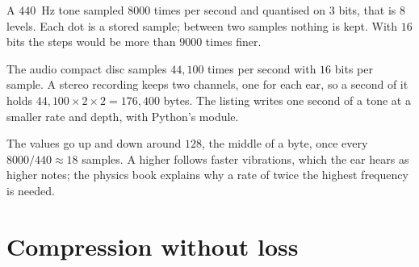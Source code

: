 \begin{omfigure}

{\small A $440$~Hz tone sampled $8000$ times per second and quantised on $3$ bits, that is $8$ levels. Each dot is a
stored sample; between two samples nothing is kept. With $16$ bits the steps would be more than $9000$ times finer.}
\end{omfigure}

The audio compact disc samples $44{,}100$ times per second with $16$ bits per sample. A stereo recording keeps two
channels, one for each ear, so a second of it holds $44{,}100 \times 2 \times 2 = 176{,}400$ bytes. The listing
writes one second of a tone at a smaller rate and depth, with Python's  module.

\label{lst:g10:images-sound-compression:make-wav}

\label{out:g10:images-sound-compression:make-wav}

The values go up and down around $128$, the middle of a byte, once every $8000 / 440 \approx 18$ samples. A higher
 follows faster vibrations, which the ear hears as higher notes; the physics book explains why a rate of
twice the highest frequency is needed.

\section{Compression without loss}\label{sec:g10:images-sound-compression:lossless}

